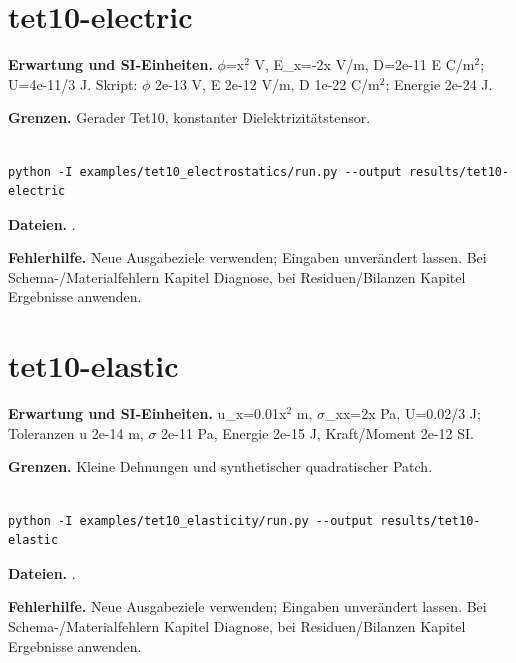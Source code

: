 \section{tet10-electric}\label{recipe:tet10-electric}

\textbf{Erwartung und SI-Einheiten.} $\phi$=x$^2$ V, E\_x=-2x V/m, D=2e-11 E C/m$^2$; U=4e-11/3 J. Skript: $\phi$ 2e-13 V, E 2e-12 V/m, D 1e-22 C/m$^2$; Energie 2e-24 J.

\textbf{Grenzen.} Gerader Tet10, konstanter Dielektrizitätstensor.

\begin{lstlisting}

python -I examples/tet10_electrostatics/run.py --output results/tet10-electric

\end{lstlisting}

\textbf{Dateien.} .

\textbf{Fehlerhilfe.} Neue Ausgabeziele verwenden; Eingaben unverändert lassen. Bei Schema-/Materialfehlern Kapitel Diagnose, bei Residuen/Bilanzen Kapitel Ergebnisse anwenden.



\section{tet10-elastic}\label{recipe:tet10-elastic}

\textbf{Erwartung und SI-Einheiten.} u\_x=0.01x$^2$ m, $\sigma$\_xx=2x Pa, U=0.02/3 J; Toleranzen u 2e-14 m, $\sigma$ 2e-11 Pa, Energie 2e-15 J, Kraft/Moment 2e-12 SI.

\textbf{Grenzen.} Kleine Dehnungen und synthetischer quadratischer Patch.

\begin{lstlisting}

python -I examples/tet10_elasticity/run.py --output results/tet10-elastic

\end{lstlisting}

\textbf{Dateien.} .

\textbf{Fehlerhilfe.} Neue Ausgabeziele verwenden; Eingaben unverändert lassen. Bei Schema-/Materialfehlern Kapitel Diagnose, bei Residuen/Bilanzen Kapitel Ergebnisse anwenden.



